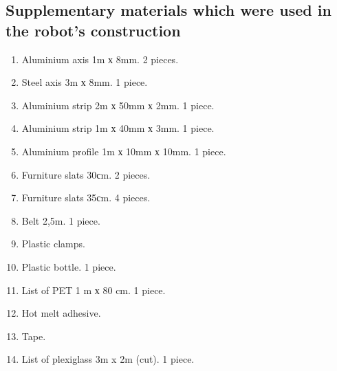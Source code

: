 
\subsection{Supplementary materials which were used in the robot's construction}

\begin{enumerate}
	\item Aluminium axis 1m х 8mm. 2 pieces.
	\item Steel axis 3m х 8mm. 1 piece.
	\item Aluminium strip 2m х 50mm х 2mm. 1 piece.
	\item Aluminium strip 1m х 40mm х 3mm. 1 piece.
	\item Aluminium profile 1m х 10mm х 10mm. 1 piece.
	\item Furniture slats 30сm. 2 pieces.
	\item Furniture slats 35сm. 4 pieces.
	\item Belt 2,5m. 1 piece.
	\item Plastic clamps.
	\item Plastic bottle. 1 piece.
	\item List of PET 1 m х 80 cm. 1 piece.
	\item Hot melt adhesive.
	\item Tape.
	\item List of plexiglass 3m x 2m (cut). 1 piece.
\end{enumerate}
\fillpage
\newpage


